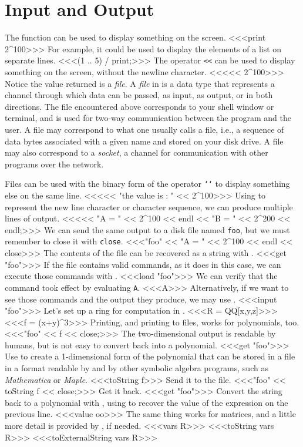 
\section{Input and Output}

The function  can be used to display something on the screen.
<<<print 2^100>>>
For example, it could be used to display the elements of a list on separate
lines.
<<<(1 .. 5) / print;>>>
The operator {\tt <<} can be used to display something on the
screen, without the newline character.
<<<<< 2^100>>>
Notice the value returned is a {\em file}.  A {\em file} in \Mtwo is a data type that
represents a channel through which data can be passed, as input, as
output, or in both directions.  The file  encountered above
corresponds to your shell window or terminal, and is used for two-way
communication between the program and the user.  A file may correspond
to what one usually calls a file, i.e., a sequence of data bytes associated
with a given name and stored on
your disk drive.  A file may also correspond to a {\em socket}, a
channel for communication with other programs over the network.

Files can be used with the binary form
of the operator {\tt \char`\<\char`\<} to display something else on the same
line.
<<<<< "the value is : " << 2^100>>>
Using  to represent the new line character or character sequence, we can
produce multiple lines of output.
<<<<< "A = " << 2^100 << endl << "B = " << 2^200 << endl;>>>
We can send the same output to a disk file named {\tt foo}, but we must remember to
close it with {\tt close}.
<<<"foo" << "A = " << 2^100 << endl << close>>>
The contents of the file can be recovered as a string with .
<<<get "foo">>>
If the file contains valid \Mtwo commands, as it does in this case, we can
execute those commands with .
<<<load "foo">>>
We can verify that the command took effect by evaluating {\tt A}.
<<<A>>>
Alternatively, if we want to see those commands and the output they produce,
we may use .
<<<input "foo">>>
Let's set up a ring for computation in \Mtwo.
<<<R = QQ[x,y,z]>>>%
<<<f = (x+y)^3>>>
Printing, and printing to files, works for polynomials,
too.%
<<<"foo" << f << close;>>>
The two-dimensional output is readable by humans, but is not easy to convert
back into a polynomial.
<<<get "foo">>>
Use  to create a 1-dimensional form of the polynomial
that can be stored in a file in a format readable by \Mtwo and by other
symbolic algebra programs, such as {\em Mathematica} or {\em Maple}.
<<<toString f>>>
Send it to the file.
<<<"foo" << toString f << close;>>>
Get it back.
<<<get "foo">>>
Convert the string back to a polynomial with , using  to
recover the value of the expression on the previous line.
<<<value oo>>>
The same thing works for matrices, and a little more detail is provided by
, if needed.
<<<vars R>>>
<<<toString vars R>>>
<<<toExternalString vars R>>>

